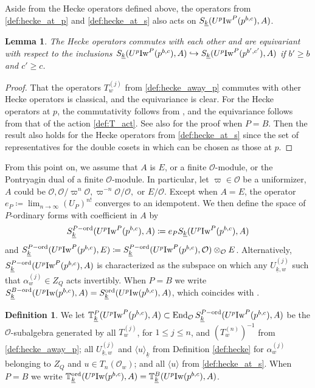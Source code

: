 \documentclass[leqno]{amsart}
\newtheorem{lem}[thm]{Lemma}
\theoremstyle{definition}
\newtheorem{defn}[thm]{Definition}
\theoremstyle{remark}
\newcommand{\oo}{\mathcal{O}}
\DeclareMathOperator{\End}{End}
\newcommand{\wt}[1]{\underline{ #1 }}
\newcommand{\Iw}{\textnormal{Iw}} %
\newcommand{\TT}{\mathbb{T}} %
\newcommand{\ord}{\textnormal{ord}} %
\begin{document}
Aside from the Hecke operators defined above,
the operators from \eqref{def:hecke_at_p} and
\eqref{def:hecke_at_s} also 
acts on $S_{\wt{k}}(U^p\Iw^P(p^{b,c}),A)$.

\begin{lem}
The Hecke operators commutes with each other
and are equivariant with respect to the inclusions
$ S_{\wt{k}}(U^p\Iw^P(p^{b,c}),A)\hookrightarrow
S_{\wt{k}}(U^p\Iw^P(p^{b',c'}),A)$
if $b'\geq b$ and $c'\geq c$.
\end{lem}
\begin{proof}
That the operators $T_w^{(j)}$ from \eqref{def:hecke_away_p}
commutes with other Hecke operators is classical,
and the equivariance is clear.
For the Hecke operators at $p$,
the commutativity follows from \cite[Lem 3.1.4]{emeI},
and the equivariance follows from 
that of the action \eqref{def:T_act}.
See also \cite[Lem 2.10]{ger} for the proof when $P=B$.
Then the result also holds for the Hecke operators from 
\eqref{def:hecke_at_s}
since the set of representatives for the double cosets
in which can be chosen as those at $p$.
\end{proof}

From this point on,
we assume that $A$ is $E$, or a finite $\oo$-module,
or the Pontryagin dual of a finite $\oo$-module.
In particular, let $\varpi\in \oo$ be a uniformizer, $A$ could be 
$\oo, \oo/\varpi^n\oo, \varpi^{-n}\oo/\oo,$ or $E/\oo$.
Except when $A=E$,
the operator $e_P\coloneqq\lim_{n\to \infty}(U_P)^{n!}$
converges to an idempotent.
We then define the space of $P$-ordinary forms 
with coefficient in $A$ by
\[
	S_{\wt{k}}^{P-\ord}(U^p\Iw^P(p^{b,c}),A)\coloneqq
	e_PS_{\wt{k}}(U^p\Iw^P(p^{b,c}),A)
\]
and $S_{\wt{k}}^{P-\ord}(U^p\Iw^P(p^{b,c}),E)\coloneqq 
S_{\wt{k}}^{P-\ord}(U^p\Iw^P(p^{b,c}),\oo)\otimes_{\oo}E$.
Alternatively,
$S_{\wt{k}}^{P-\ord}(U^p\Iw^P(p^{b,c}),A)$
is characterized as the subspace on which 
any  $U_{\wt{k},w}^{(j)}$ such that 
$\alpha_w^{(j)}\in Z_Q$ acts invertibly.
When $P=B$ we write 
$S_{\wt{k}}^{B-\ord}(U^p\Iw(p^{b,c}),A)=
S_{\wt{k}}^{\ord}(U^p\Iw(p^{b,c}),A)$,
which coincides with \cite[Def 2.13]{ger}.

\begin{defn}\label{def:ord_hecke}
	We let $\TT^P_{\wt{k}}(U^p\Iw^P(p^{b,c}),A)\subset 
    \End_{\oo}S_{\wt{k}}^{P-\ord}(U^p\Iw^P(p^{b,c}),A)$
	be the $\oo$-subalgebra
	generated by all
	$T_w^{(j)}$, for $1\leq j\leq n$,
	and $(T_w^{(n)})^{-1}$ from \eqref{def:hecke_away_p};
	all $U_{\wt{k},w}^{(j)}$ and $\langle u\rangle_{\wt{k}}$
    from Definition \ref{def:hecke}
	for $\alpha_w^{(j)}$ belonging to $Z_Q$ and $u\in T_n(\oo_w)$;
    and all $\langle u\rangle$ from \eqref{def:hecke_at_s}.
    When $P=B$
    we write $\TT^{\ord}_{\wt{k}}(U^p\Iw(p^{b,c}),A)=
    \TT^B_{\wt{k}}(U^p\Iw(p^{b,c}),A)$.
\end{defn}
\end{document}
